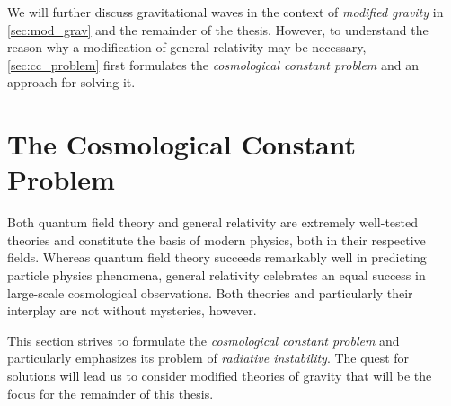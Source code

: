 \documentclass[parskip=half]{scrreprt}
\begin{document}
 


We will further discuss gravitational waves in the context of \emph{modified gravity} in \autoref{sec:mod_grav} and the remainder of the thesis. However, to understand the reason why a modification of general relativity may be necessary, \autoref{sec:cc_problem} first formulates the \emph{cosmological constant problem} and an approach for solving it.

\section{The Cosmological Constant Problem}\label{sec:cc_problem}

Both quantum field theory and general relativity are extremely well-tested theories and constitute the basis of modern physics, both in their respective fields. Whereas quantum field theory succeeds remarkably well in predicting particle physics phenomena, general relativity celebrates an equal success in large-scale cosmological observations. Both theories and particularly their interplay are not without mysteries, however.

This section strives to formulate the \emph{cosmological constant problem} and particularly emphasizes its problem of \emph{radiative instability}. The quest for solutions will lead us to consider modified theories of gravity that will be the focus for the remainder of this thesis.
\end{document}

